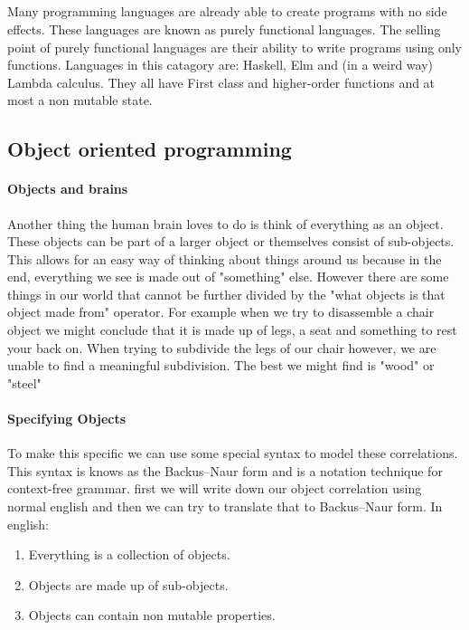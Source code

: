 \documentclass{scrartcl}
\begin{document}
    \subparagraph{}
    Many programming languages are already able to create programs with no
    side effects. These languages are known as purely functional languages. 
    The selling point of purely functional languages are their ability to 
    write programs using only functions. Languages in this catagory are:
    Haskell, Elm and (in a weird way) Lambda calculus. They all have First
    class and higher-order functions and at most a non mutable state.

    \subsection{Object oriented programming}
    \paragraph{Objects and brains}
    Another thing the human brain loves to do is think of everything as an object.
    These objects can be part of a larger object or themselves consist of sub-objects.
    This allows for an easy way of thinking about things around us because in the
    end, everything we see is made out of "something" else. However there are some things
    in our world that cannot be further divided by the "what objects is that object made from"
    operator. For example when we try to disassemble a chair object we might conclude that
    it is made up of legs, a seat and something to rest your back on. When trying to 
    subdivide the legs of our chair however, we are unable to find a meaningful subdivision.
    The best we might find is "wood" or "steel"

    \paragraph{Specifying Objects}
    To make this specific we can use some special syntax to model these correlations.
    This syntax is knows as the Backus–Naur form and is a notation technique for context-free
    grammar. first we will write down our object correlation using normal english and then we
    can try to translate that to Backus–Naur form.
    \newline
    In english:
    \begin{enumerate}
        \item Everything is a collection of objects.
        \item Objects are made up of sub-objects.
        \item Objects can contain non mutable properties.
    \end{enumerate}
\end{document}
